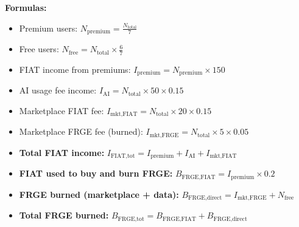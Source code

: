 \textbf{\textcolor{fabPrimary}{Formulas:}}

\begin{itemize}[leftmargin=*]
    \item Premium users: $N_{\text{premium}} = \frac{N_{\text{total}}}{7}$
    \item Free users: $N_{\text{free}} = N_{\text{total}} \times \frac{6}{7}$
    \item FIAT income from premiums: $I_{\text{premium}} = N_{\text{premium}} \times 150$
    \item AI usage fee income: $I_{\text{AI}} = N_{\text{total}} \times 50 \times 0.15$
    \item Marketplace FIAT fee: $I_{\text{mkt,FIAT}} = N_{\text{total}} \times 20 \times 0.15$
    \item Marketplace FRGE fee (burned): $I_{\text{mkt,FRGE}} = N_{\text{total}} \times 5 \times 0.05$
    \item \textbf{Total FIAT income:} $I_{\text{FIAT,tot}} = I_{\text{premium}} + I_{\text{AI}} + I_{\text{mkt,FIAT}}$
    \item \textbf{FIAT used to buy and burn FRGE:} $B_{\text{FRGE,FIAT}} = I_{\text{premium}} \times 0.2$
    \item \textbf{FRGE burned (marketplace + data):} $B_{\text{FRGE,direct}} = I_{\text{mkt,FRGE}} + N_{\text{free}}$
    \item \textbf{Total FRGE burned:} $B_{\text{FRGE,tot}} = B_{\text{FRGE,FIAT}} + B_{\text{FRGE,direct}}$
\end{itemize}

